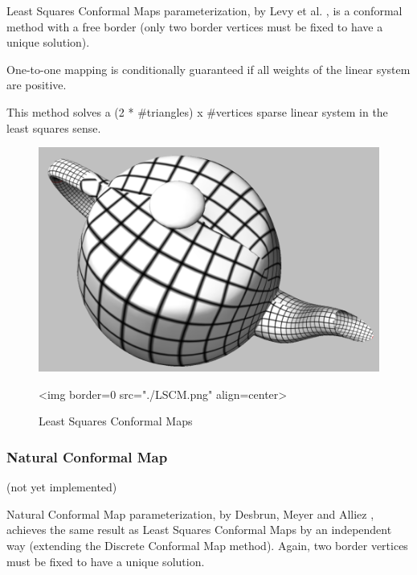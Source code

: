 Least Squares Conformal Maps parameterization, by Levy et al.
\cite{cgal:lprm-lscm-02}, is a conformal method with a free
border (only two border vertices must be fixed to have a unique solution).

One-to-one mapping is conditionally guaranteed if all weights
of the linear system are positive.

This method solves a (2 * \#triangles) x \#vertices sparse linear system
in the least squares sense.

\begin{figure}[bht]
    \begin{center}
        \begin{ccTexOnly}
            \includegraphics{Parameterization/LSCM} %
        \end{ccTexOnly}
        \begin{ccHtmlOnly}
            <img border=0 src="./LSCM.png" align=center>
        \end{ccHtmlOnly}
        \label{parameterization-fig-LSCM}

        \caption{Least Squares Conformal Maps}
    \end{center}
\end{figure}


\subsubsection{Natural Conformal Map}

(not yet implemented)

Natural Conformal Map parameterization, by Desbrun, Meyer and Alliez
\cite{cgal:dma-ipsm-02}, achieves the same result as
Least Squares Conformal Maps by an independent
way (extending the Discrete Conformal Map method). Again,
two border vertices must be fixed to have a unique solution.

